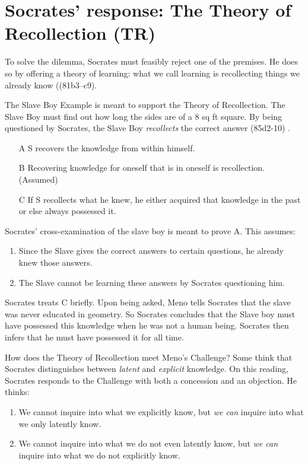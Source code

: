 \documentclass[10 pt]{article}
\begin{document}
\section*{Socrates' response: The Theory of Recollection (TR)}
To solve the dilemma, Socrates must feasibly reject one of the premises. He does so by offering a theory of learning: what we call learning is recollecting things we already know ((81b3--c9).

The Slave Boy Example is meant to support the Theory of Recollection. The Slave Boy must find out how long the sides are of a 8 sq ft square. By being questioned by Socrates, the Slave Boy \emph{recollects} the correct answer (85d2-10) .

\begin{enumerate}
\item[A] S recovers the knowledge from within himself.
\item[B] Recovering knowledge for oneself that is in oneself is recollection. (Assumed)
\item[C] If S recollects what he knew, he either acquired that knowledge in the past or else always possessed it. 
\end{enumerate} 

Socrates' cross-examination of the slave boy is meant to prove A. This assumes:
\begin{enumerate}
\item Since the Slave gives the correct answers to certain questions, he already knew those answers. 
\item The Slave cannot be learning these answers by Socrates questioning him. 
\end{enumerate}
 
Socrates treats C briefly. Upon being asked, Meno tells Socrates that the slave was never educated in geometry. So Socrates concludes that the Slave boy must have possessed this knowledge when he was not a human being. Socrates then infers that he must have possessed it for all time. 

How does the Theory of Recollection meet Meno's Challenge? Some think that Socrates distinguishes between \emph{latent} and \emph{explicit} knowledge. On this reading, Socrates responds to the Challenge with both a concession and an objection. He thinks:
\begin{enumerate}
\item We cannot inquire into what we explicitly know, but \emph{we can} inquire into what we only latently know. 
\item We cannot inquire into what we do not even latently know, but \emph{we can} inquire into what we do not explicitly know.
\end{enumerate}
\end{document}
